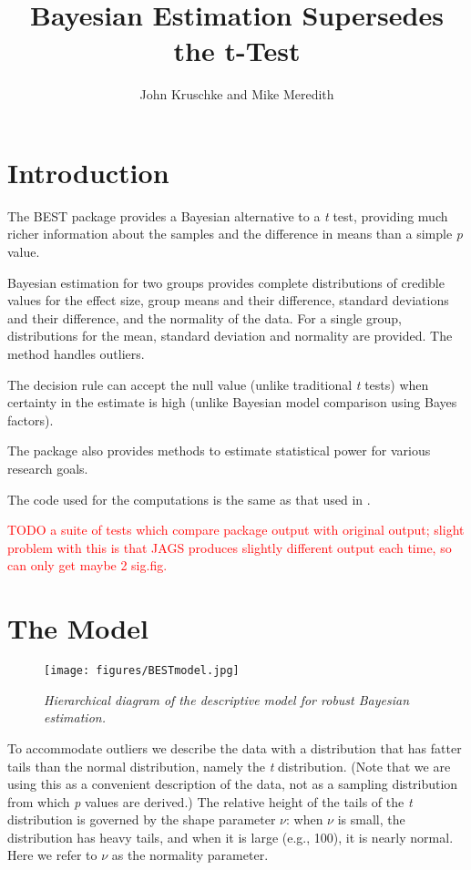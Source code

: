 \documentclass[a4paper]{article}
\title{Bayesian Estimation Supersedes the t-Test}
\author{John Kruschke and Mike Meredith}
\begin{document}
\maketitle


\section{Introduction}
\label{sec:intro}

The BEST package provides a Bayesian alternative to a \emph{t} test, providing much richer information about the samples and the difference in means than a simple \emph{p} value.

Bayesian estimation for two groups provides complete distributions of credible values for the effect size, group means and their difference, standard deviations and their difference, and the normality of the data. For a single group, distributions for the mean, standard deviation and normality are provided. The method handles outliers.

The decision rule can accept the null value (unlike traditional \emph{t} tests) when certainty in the estimate is high (unlike Bayesian model comparison using Bayes factors).

The package also provides methods to estimate statistical power for various research goals.

The code used for the computations is the same as that used in \citet{kruschke2012BEST}.

\textcolor{red}{TODO a suite of tests which compare package output with original output; slight problem with this is that JAGS produces slightly different output each time, so can only get maybe 2 sig.fig.}


\section{The Model}
\label{sec:model}

\begin{figure}[t]
  \centering
  \texttt{[image: figures/BESTmodel.jpg]}
  \caption{\it Hierarchical diagram of the descriptive model for robust Bayesian estimation.}
  \label{fig:model}
\end{figure}

To accommodate outliers we describe the data with a distribution that has fatter tails than the normal distribution, namely the \emph{t} distribution. (Note that we are using this as a convenient description of the data, not as a sampling distribution from which \emph{p} values are derived.) The relative height of the tails of the \emph{t} distribution is governed by the shape parameter $\nu$: when $\nu$ is small, the distribution has heavy tails, and when it is large (e.g., 100), it is nearly normal. Here we refer to $\nu$ as the normality parameter.
\end{document}

